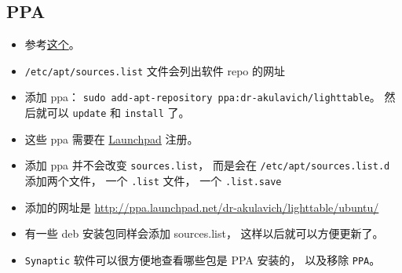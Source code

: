 \subsection{PPA}
\begin{itemize}
\item 参考\href{https://itsfoss.com/ppa-guide/}{这个}。
\item \verb`/etc/apt/sources.list` 文件会列出软件 repo 的网址
\item 添加 ppa： \verb`sudo add-apt-repository ppa:dr-akulavich/lighttable`。 然后就可以 \verb`update` 和 \verb`install` 了。
\item 这些 ppa 需要在 \href{https://launchpad.net/}{Launchpad} 注册。
\item 添加 ppa 并不会改变 \verb`sources.list`， 而是会在 \verb`/etc/apt/sources.list.d` 添加两个文件， 一个 \verb`.list` 文件， 一个 \verb`.list.save`
\item 添加的网址是 \href{http://ppa.launchpad.net/dr-akulavich/lighttable/ubuntu/}{http://ppa.launchpad.net/dr-akulavich/lighttable/ubuntu/}
\item 有一些 deb 安装包同样会添加 sources.list， 这样以后就可以方便更新了。
\item \verb`Synaptic` 软件可以很方便地查看哪些包是 PPA 安装的， 以及移除 \verb`PPA`。
\end{itemize}
